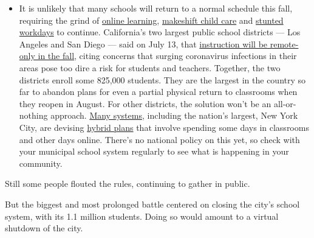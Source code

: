 \begin{itemize}
  \begin{itemize}
  \tightlist
  \item
    It is unlikely that many schools will return to a normal schedule
    this fall, requiring the grind of
    \href{https://www.nytimes.com/2020/06/05/us/coronavirus-education-lost-learning.html?action=click\&pgtype=Article\&state=default\&region=MAIN_CONTENT_3\&context=storylines_faq}{online
    learning},
    \href{https://www.nytimes.com/2020/05/29/us/coronavirus-child-care-centers.html?action=click\&pgtype=Article\&state=default\&region=MAIN_CONTENT_3\&context=storylines_faq}{makeshift
    child care} and
    \href{https://www.nytimes.com/2020/06/03/business/economy/coronavirus-working-women.html?action=click\&pgtype=Article\&state=default\&region=MAIN_CONTENT_3\&context=storylines_faq}{stunted
    workdays} to continue. California's two largest public school
    districts --- Los Angeles and San Diego --- said on July 13, that
    \href{https://www.nytimes.com/2020/07/13/us/lausd-san-diego-school-reopening.html?action=click\&pgtype=Article\&state=default\&region=MAIN_CONTENT_3\&context=storylines_faq}{instruction
    will be remote-only in the fall}, citing concerns that surging
    coronavirus infections in their areas pose too dire a risk for
    students and teachers. Together, the two districts enroll some
    825,000 students. They are the largest in the country so far to
    abandon plans for even a partial physical return to classrooms when
    they reopen in August. For other districts, the solution won't be an
    all-or-nothing approach.
    \href{https://bioethics.jhu.edu/research-and-outreach/projects/eschool-initiative/school-policy-tracker/}{Many
    systems}, including the nation's largest, New York City, are
    devising
    \href{https://www.nytimes.com/2020/06/26/us/coronavirus-schools-reopen-fall.html?action=click\&pgtype=Article\&state=default\&region=MAIN_CONTENT_3\&context=storylines_faq}{hybrid
    plans} that involve spending some days in classrooms and other days
    online. There's no national policy on this yet, so check with your
    municipal school system regularly to see what is happening in your
    community.
  \end{itemize}
\end{itemize}

Still some people flouted the rules, continuing to gather in public.

But the biggest and most prolonged battle centered on closing the city's
school system, with its 1.1 million students. Doing so would amount to a
virtual shutdown of the city.

